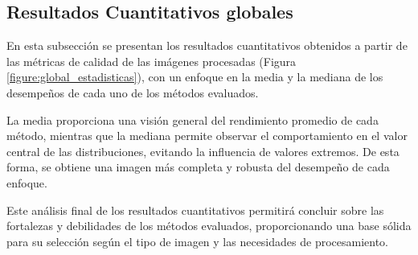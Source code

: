 \documentclass[sigchi]{acmart}
\begin{document}
\newpage

\subsection{Resultados Cuantitativos globales} \label{subsec:resultados_cuantitativos}

En esta subsección se presentan los resultados cuantitativos obtenidos a partir de las métricas
de calidad de las imágenes procesadas (Figura \ref{figure:global_estadisticas}), con un enfoque en la media y la mediana de los
desempeños de cada uno de los métodos evaluados.

La media proporciona una visión general del rendimiento promedio de cada método, mientras que
la mediana permite observar el comportamiento en el valor central de las distribuciones,
evitando la influencia de valores extremos. De esta forma, se obtiene una imagen más completa y
robusta del desempeño de cada enfoque.

Este análisis final de los resultados cuantitativos permitirá concluir sobre las fortalezas y
debilidades de los métodos evaluados, proporcionando una base sólida para su selección según el
tipo de imagen y las necesidades de procesamiento.
\end{document}
